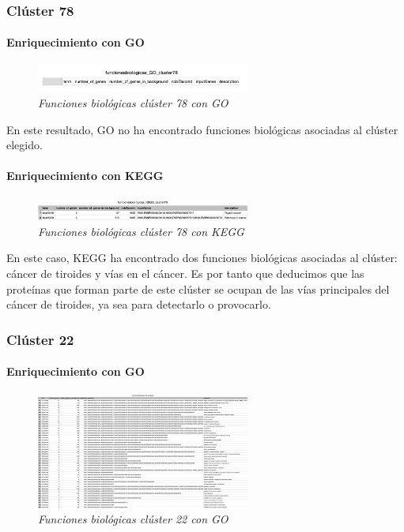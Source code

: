 \subsubsection{Clúster 78}

\paragraph{Enriquecimiento con GO}

\begin{figure}[h]
	\centering
	\includegraphics[width=70mm,scale=1.2]{figures/cluster78_GO.png}
	\caption{\textit{Funciones biológicas clúster 78 con GO}}
\end{figure}

En este resultado, GO no ha encontrado funciones biológicas asociadas al clúster elegido.

\paragraph{Enriquecimiento con KEGG}

\begin{figure}[h]
	\centering
	\includegraphics[width=70mm,scale=1.2]{figures/cluster78_KEGG.png}
	\caption{\textit{Funciones biológicas clúster 78 con KEGG}}
\end{figure}

En este caso, KEGG ha encontrado dos funciones biológicas asociadas al clúster: cáncer de tiroides y vías en el cáncer. Es por tanto que deducimos que las proteínas que forman parte de este clúster se ocupan de las vías principales del cáncer de tiroides, ya sea para detectarlo o provocarlo.

\subsubsection{Clúster 22}

\paragraph{Enriquecimiento con GO}

\begin{figure}[h]
	\centering
	\includegraphics[width=70mm,scale=1.2]{figures/cluster22_GO.png}
	\caption{\textit{Funciones biológicas clúster 22 con GO}}
\end{figure}

